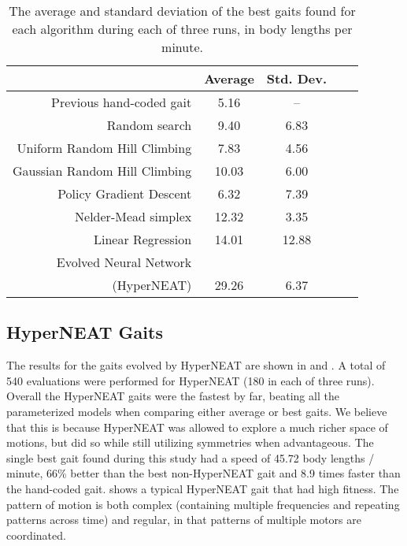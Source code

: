 \begin{table}
\begin{center}
\begin{tabular}{|r|c|c|c||c|}
\hline
                                         & Average & Std. Dev. \\
\hline                                    
\hline                                    
Previous hand-coded gait                 & 5.16   &   --     \\
\hline
Random search                            & 9.40   &   6.83   \\
\hline
Uniform Random Hill Climbing             & 7.83   &   4.56   \\
\hline
Gaussian Random Hill Climbing            & 10.03  &   6.00   \\
\hline
Policy Gradient Descent                  & 6.32   &   7.39   \\
\hline
Nelder-Mead simplex                      & 12.32  &   3.35   \\
\hline
Linear Regression                        & 14.01  &  12.88   \\
\hline
Evolved Neural Network              &        &          \\
(HyperNEAT)                              & 29.26  &   6.37   \\
\hline
\end{tabular}
\caption{The average and standard deviation of the best gaits found
  for each algorithm during each of three runs, in body lengths per
  minute.}  
\end{center}
\end{table}







\subsection{HyperNEAT Gaits}

The results for the gaits evolved by HyperNEAT are shown in
 and .  A total of 540 evaluations
were performed for HyperNEAT (180 in each of three runs).
Overall the HyperNEAT gaits
were the fastest by far, beating all the parameterized models when
comparing either average or best gaits.  We believe that this is
because HyperNEAT was allowed to explore a much richer space of
motions, but did so while still utilizing symmetries when
advantageous.  The single best gait found during this study had a
speed of 45.72 body lengths / minute, 66\% better than the best
non-HyperNEAT gait and 8.9 times faster than the hand-coded gait.
 shows a typical
HyperNEAT gait that had high fitness.  The pattern of motion is both
complex (containing multiple frequencies and repeating patterns across
time) and regular, in that patterns of multiple motors are
coordinated.

